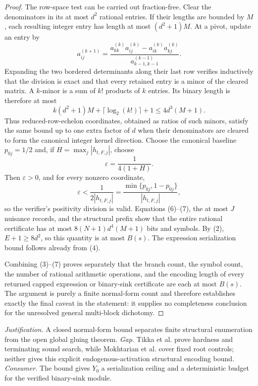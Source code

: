\documentclass{article}
\begin{document}
\begin{proof}
The row-space test can be carried out fraction-free.  Clear the denominators in its at most \(d^2\) rational entries.  If their lengths are bounded by \(M\), each resulting integer entry has length at most \((d^2+1)M\).  At a pivot, update an entry by
\[
 a^{(k+1)}_{ij}
 =\frac{a^{(k)}_{kk}a^{(k)}_{ij}-a^{(k)}_{ik}a^{(k)}_{kj}}
 {a^{(k-1)}_{k-1,k-1}}.
\]
Expanding the two bordered determinants along their last row verifies inductively that the division is exact and that every retained entry is a minor of the cleared matrix.  A \(k\)-minor is a sum of \(k!\) products of \(k\) entries.  Its binary length is therefore at most
\[
 k(d^2+1)M+\lceil\log_2(k!)\rceil+1
 \leq 4d^3(M+1). \tag{7}
\]
Thus reduced-row-echelon coordinates, obtained as ratios of such minors, satisfy the same bound up to one extra factor of \(d\) when their denominators are cleared to form the canonical integer kernel direction.  Choose the canonical baseline \(p_{0j}=1/2\) and, if \(H=\max_j|h_{t,F,j}|\), choose
\[
 \varepsilon=\frac{1}{4(1+H)}.
\]
Then \(\varepsilon>0\), and for every nonzero coordinate,
\[
 \varepsilon<\frac{1}{2|h_{t,F,j}|}
 =\frac{\min\{p_{0j},1-p_{0j}\}}{|h_{t,F,j}|},
\]
so the verifier's positivity division is valid.  Equations (6)--(7), the at most \(J\) nuisance records, and the structural prefix show that the entire rational certificate has at most \(8(N+1)d^4(M+1)\) bits and symbols.  By (2), \(E+1\geq8d^2\), so this quantity is at most \(B(s)\).  The expression serialization bound follows already from (4).

Combining (3)--(7) proves separately that the branch count, the symbol count, the number of rational arithmetic operations, and the encoding length of every returned capped expression or binary-sink certificate are each at most \(B(s)\).  The argument is purely a finite normal-form count and therefore establishes exactly the final caveat in the statement: it supplies no completeness conclusion for the unresolved general multi-block dichotomy.
\end{proof}
\par\smallskip\noindent \textit{Justification.} A closed normal-form bound separates finite structural enumeration from the open global gluing theorem. \textit{Gap.} Tikka et al. prove hardness and terminating sound search, while Mokhtarian et al. cover fixed root controls; neither gives this explicit endogenous-activation structural encoding bound. \textit{Consumer.} The bound gives \(Y_0\) a serialization ceiling and a deterministic budget for the verified binary-sink module.
\end{document}

